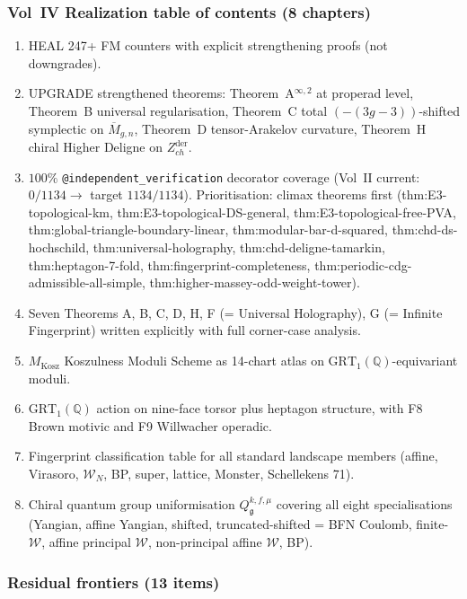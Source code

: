 \documentclass[11pt]{article}
\begin{document}
\begin{remark}
\begin{remark}
\subsubsection*{Vol~IV Realization table of contents (8 chapters)}

\begin{enumerate}
\item[IV.1] HEAL 247+ FM counters with explicit strengthening proofs
(not downgrades).
\item[IV.2] UPGRADE strengthened theorems: Theorem~A$^{\infty,2}$ at
properad level, Theorem~B universal regularisation, Theorem~C total
$(-(3g-3))$-shifted symplectic on $\overline{M}_{g,n}$, Theorem~D
tensor-Arakelov curvature, Theorem~H chiral Higher Deligne on
$Z^{\mathrm{der}}_{ch}$.
\item[IV.3] $100\%$ \texttt{@independent\_verification} decorator
coverage (Vol~II current: $0/1134 \to$ target $1134/1134$).
Prioritisation: climax theorems first
(thm:E3-topological-km, thm:E3-topological-DS-general,
thm:E3-topological-free-PVA, thm:global-triangle-boundary-linear,
thm:modular-bar-d-squared, thm:chd-ds-hochschild, thm:universal-holography,
thm:chd-deligne-tamarkin, thm:heptagon-7-fold, thm:fingerprint-completeness,
thm:periodic-cdg-admissible-all-simple, thm:higher-massey-odd-weight-tower).
\item[IV.4] Seven Theorems A, B, C, D, H, F (= Universal Holography),
G (= Infinite Fingerprint) written explicitly with full corner-case
analysis.
\item[IV.5] $M_{\mathrm{Kosz}}$ Koszulness Moduli Scheme as 14-chart
atlas on $\mathrm{GRT}_1(\mathbb{Q})$-equivariant moduli.
\item[IV.6] $\mathrm{GRT}_1(\mathbb{Q})$ action on nine-face torsor
plus heptagon structure, with F8 Brown motivic and F9 Willwacher
operadic.
\item[IV.7] Fingerprint classification table for all standard landscape
members (affine, Virasoro, $\mathcal{W}_N$, BP, super, lattice,
Monster, Schellekens 71).
\item[IV.8] Chiral quantum group uniformisation
$Q_{\mathfrak{g}}^{k, f, \mu}$ covering all eight specialisations
(Yangian, affine Yangian, shifted, truncated-shifted = BFN Coulomb,
finite-$\mathcal{W}$, affine principal $\mathcal{W}$, non-principal
affine $\mathcal{W}$, BP).
\end{enumerate}

\subsubsection*{Residual frontiers (13 items)}


\end{remark}
\end{remark}
\end{document}
